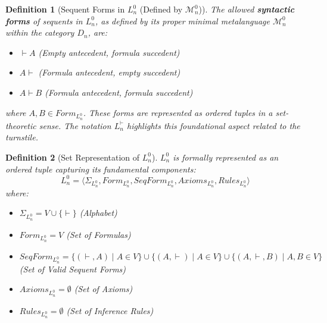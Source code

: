 \documentclass{article}
\newtheorem{definition}{Definition}[section] %
\begin{document}
																							\begin{definition}[Sequent Forms in $L^0_n$ (Defined by $\mathcal{M}^0_n$)]
																								The allowed \textbf{syntactic forms} of sequents in $L^0_n$, as defined by its proper minimal metalanguage $\mathcal{M}^0_n$ within the category $D_n$, are:
																								\begin{itemize}
																									\item $\vdash A$ (Empty antecedent, formula succedent)
																									\item $A \vdash$ (Formula antecedent, empty succedent)
																									\item $A \vdash B$ (Formula antecedent, formula succedent)
																									\end{itemize}
																										where $A, B \in Form_{L^0_n}$. These forms are represented as ordered tuples in a set-theoretic sense. The notation $L^{\vdash}_n$ highlights this foundational aspect related to the turnstile.
																										\end{definition}
																											
																											\begin{definition}[Set Representation of $L^0_n$]
																												$L^0_n$ is formally represented as an ordered tuple capturing its fundamental components:
																												$$L^0_n = \langle \Sigma_{L^0_n}, Form_{L^0_n}, SeqForm_{L^0_n}, Axioms_{L^0_n}, Rules_{L^0_n} \rangle$$
																												where:
																												\begin{itemize}
																													\item $\Sigma_{L^0_n} = V \cup \{\vdash\}$ (Alphabet)
																													\item $Form_{L^0_n} = V$ (Set of Formulas)
																													\item $SeqForm_{L^0_n} = \{(\vdash, A) \mid A \in V\} \cup \{(A, \vdash) \mid A \in V\} \cup \{(A, \vdash, B) \mid A, B \in V\}$ (Set of Valid Sequent Forms)
																													\item $Axioms_{L^0_n} = \emptyset$ (Set of Axioms)
																													\item $Rules_{L^0_n} = \emptyset$ (Set of Inference Rules)
																													\end{itemize}
																														\end{definition}
																															
\end{document}
